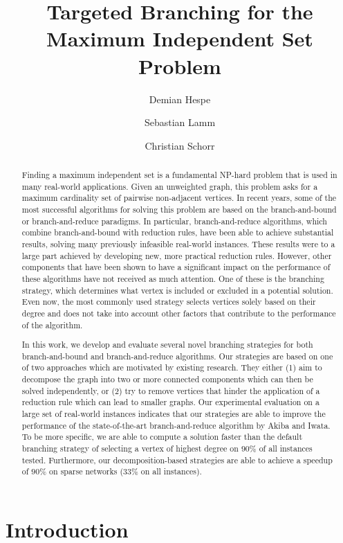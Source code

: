 \documentclass[a4paper,UKenglish,cleveref, autoref, thm-restate]{lipics-v2021}
\title{Targeted Branching for the Maximum Independent Set Problem} %
\author{Demian Hespe}{Karlsruhe Institute of Technology, Institute for
  Theoretical Informatics,
  Germany}{hespe@kit.edu}{https://orcid.org/0000-0001-6232-2951}{}
\author{Sebastian Lamm}{Karlsruhe Institute of Technology, Institute for
  Theoretical Informatics, Germany}{lamm@kit.edu}{https://orcid.org/0000-0001-7828-921X}{}
\author{Christian Schorr}{Karlsruhe Institute of Technology, Institute for
  Theoretical Informatics, Germany}{christian.schorr@student.kit.edu}{}{}
\begin{document}
\maketitle

\begin{abstract}
  Finding a maximum independent set is a fundamental NP-hard problem that is used in many real-world applications.
Given an unweighted graph, this problem asks for a maximum cardinality set of pairwise non-adjacent vertices.
In recent years, some of the most successful algorithms for solving this problem are based on the branch-and-bound or branch-and-reduce paradigms.
In particular, branch-and-reduce algorithms, which combine branch-and-bound with reduction rules, have been able to achieve substantial results, solving many previously infeasible real-world instances.
These results were to a large part achieved by developing new, more practical reduction rules.
However, other components that have been shown to have a significant impact on the performance of these algorithms have not received as much attention.
One of these is the branching strategy, which determines what vertex is included or excluded in a potential solution.
Even now, the most commonly used strategy selects vertices solely based on their degree and does not take into account other factors that contribute to the performance of the algorithm.

In this work, we develop and evaluate several novel branching strategies for both branch-and-bound and branch-and-reduce algorithms.
Our strategies are based on one of two approaches which are motivated by existing research. 
They either (1) aim to decompose the graph into two or more connected components which can then be solved independently, or (2) try to remove vertices that hinder the application of a reduction rule which can lead to smaller graphs.
Our experimental evaluation on a large set of real-world instances indicates
that our strategies are able to improve the performance of the state-of-the-art
branch-and-reduce algorithm by Akiba and Iwata. To be more specific,
we are able to compute a solution faster than the default branching strategy of selecting a vertex of highest degree on $90\%$ of all instances tested.
Furthermore, our decomposition-based strategies are able to achieve a speedup of $90\%$ on sparse networks ($33\%$ on all instances).

\end{abstract}


\section{Introduction}
\end{document}
